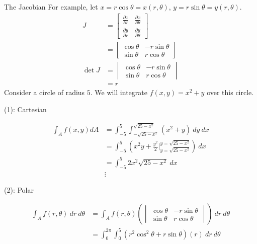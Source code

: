 \documentclass[8pt]{extarticle}
\begin{document}
\begin{problem}{The Jacobian}
    For example, let $x = r\cos \theta = x(r,\theta)$, $y = r\sin\theta = y(r,\theta)$.
    \begin{align*}
      J &= \begin{bmatrix}\frac{\partial x}{\partial r} & \frac{\partial x}{\partial \theta}\\ \frac{\partial y}{\partial r}&\frac{\partial y}{\partial \theta}\end{bmatrix}\\
        &=\begin{bmatrix}\cos\theta & -r\sin\theta\\ \sin\theta&r\cos\theta\end{bmatrix}\\
      \det J &= \begin{vmatrix}\cos\theta & -r\sin\theta\\ \sin\theta&r\cos\theta\end{vmatrix}\\
             &= r
    \end{align*}
    Consider a circle of radius $5$. We will integrate $f(x,y) = x^2 + y$ over this circle.
    \begin{description}
      \item[(1): Cartesian]
    \end{description}
    \begin{align*}
      \int_{A} f(x,y) dA &= \int_{-5}^{5} \int_{-\sqrt{25-x^2}}^{\sqrt{25-x^2}}\left(x^2 + y\right)~dy~dx\\
                         &= \int_{-5}^{5} \left(x^2y + \frac{y^2}{2}\biggr\vert_{y=\sqrt{25-x^2}}^{y=\sqrt{25-x^2}}\right)~dx\\
                         &=\int_{-5}^{5} 2x^2\sqrt{25-x^2}~dx\\
                         &\vdots
    \end{align*}
    \begin{description}
      \item[(2): Polar]
    \end{description}
    \begin{align*}
      \int_{A}f(r,\theta)~dr~d\theta &= \int_{A}f(r,\theta)\left(\begin{vmatrix}\cos\theta & -r\sin\theta\\ \sin\theta&r\cos\theta\end{vmatrix}\right)~dr~d\theta\\
                                     &= \int_{0}^{2\pi}\int_{0}^{5}\left(r^2\cos^2\theta + r\sin\theta\right)(r)~dr~d\theta\\

\end{align*}
\end{problem}
\end{document}
